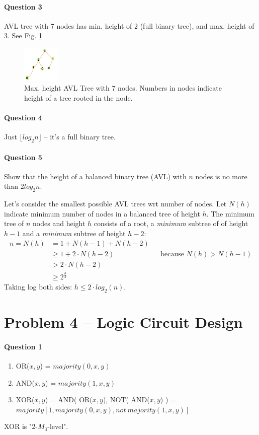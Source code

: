 \paragraph{Question 3}
AVL tree with $7$ nodes has min. height of $2$ (full binary tree), and max. height of $3$. See Fig. \ref{fig:2016-3-3avl}
\begin{figure}[!h]
    \centering
    \includegraphics[width=50pt]{data/2016-W-3-3.png}
    \caption{Max. height AVL Tree with 7 nodes.
    Numbers in nodes indicate height of a tree rooted in the node. }
    \label{fig:2016-3-3avl}
\end{figure}

\paragraph{Question 4}
Just $\lfloor log_2n\rfloor$ – it's a full binary tree.


\paragraph{Question 5}
Show that the height of a balanced binary tree (AVL) with $n$ nodes is no more than $2log_2n$.

Let's consider the smallest possible AVL trees wrt number of nodes.
Let $N(h)$ indicate minimum number of nodes in a balanced tree of height $h$.
The minimum tree of $n$ nodes and height $h$ consists of a root, a \emph{minimum} subtree of of height $h-1$ and a \emph{minimum} subtree of height $h-2$:
\begin{align*}
    n = N(h) &= 1 + N(h-1) + N(h-2) \\
            &\geq 1 + 2 \cdot N(h-2) && \text{because } N(h) > N(h-1) \\ 
            &> 2 \cdot N(h-2) \\
            &\geq 2^{\frac{h}{2}}
\end{align*}
Taking log both sides: $h \leq 2\cdot log_2(n)$.


\section{Problem 4 – Logic Circuit Design}
\paragraph{Question 1}
\begin{enumerate}
    \item OR($x, y$) = $majority(0, x, y)$
    \item AND($x, y$) = $majority(1, x, y)$
    \item XOR($x, y$) = AND( OR($x,y$), NOT( AND($x, y$) ) = $majority[1, majority(0,x,y) , not\:majority(1, x, y)]$
\end{enumerate}
XOR is "$2$-$M_3$-level".

